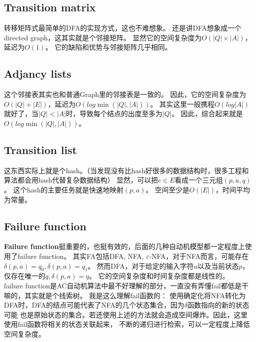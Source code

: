 \documentclass[UTF8]{ctexart}
\theoremstyle{definition}
\theoremstyle{remark}
\numberwithin{equation}{subsection}
\newcommand{\Emph}{\textbf}
\begin{document}
\subsection{Transition matrix}

	转移矩阵式最简单的DFA的实现方式，这也不难想象。
	还是讲DFA想象成一个directed graph，这其实就是个邻接矩阵。
	显然它的空间复杂度为$O(|Q| \times |A|)$，延迟为$O(1)$。
	它的缺陷和优势与邻接矩阵几乎相同。
	
\subsection{Adjancy lists}
	
	这个邻接表其实也和普通Graph里的邻接表是一致的。
	因此，它的空间复杂度为$O(|Q| + |E|)$，延迟为$O(log \min(|Q|, |A|))$。
	其实这里一般携程$O(log |A|)$就好了，当$|Q|<|A|$时，导致每个结点的出度至多为$|Q|$。
	因此，综合起来就是$O(log \min(|Q|, |A|))$。
	
\subsection{Transition list}
	
	这东西实际上就是个hash。（当发现没有比hash好很多的数据结构时，很多工程和算法都会用hash代替复杂数据结构）
	显然，可以把$e \in E$看成一个三元组$(p, a, q)$。
	这个hash的主要任务就是快速地映射$(p,a)$。
	空间至少是$O(|E|)$，时间平均为常量。
	
\subsection{Failure function}
\label{sub:failure_function}

	\Emph{Failure function}挺重要的，也挺有效的，后面的几种自动机模型都一定程度上使用了failure function。
	其实FA包括DFA, NFA, $\varepsilon$-NFA，对于NFA而言，可能存在$\delta(p,a)=q_0, \delta(p,a)=q_1$。
	然而DFA，对于给定的输入字符$a$以及当前状态$p$，仅存在唯一的$q, \delta(p,a)=q$。
	它的空间复杂度和时间复杂度都是线性的。	\\
	
	failure function是AC自动机算法中最不好理解的部分，一直没有弄懂fail都低是干嘛的，其实就是个线索树。
	我是这么理解fail函数的：
	使用确定化将NFA转化为DFA时，DFA的结点可能代表了NFA的几个状态集合，因为$\delta$函数指向的新的状态可能
	也是原始状态的集合。若还使用上述的方法就会造成空间爆炸。因此，这里使用fail函数将相关的状态关联起来，
	不断的递归进行检索，可以一定程度上降低空间复杂度。
	
\end{document}
